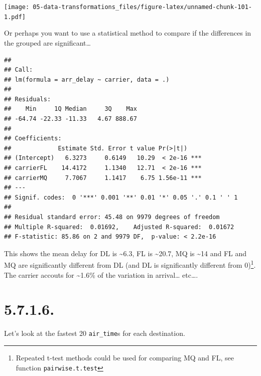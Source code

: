 \documentclass[]{book}
\newenvironment{Shaded}{\begin{snugshade}}{\end{snugshade}}
\newcommand{\DataTypeTok}[1]{\textcolor[rgb]{0.13,0.29,0.53}{#1}}
\newcommand{\KeywordTok}[1]{\textcolor[rgb]{0.13,0.29,0.53}{\textbf{#1}}}
\newcommand{\NormalTok}[1]{#1}
\newcommand{\OperatorTok}[1]{\textcolor[rgb]{0.81,0.36,0.00}{\textbf{#1}}}
\newcommand{\StringTok}[1]{\textcolor[rgb]{0.31,0.60,0.02}{#1}}
\let\rmarkdownfootnote\footnote%
\def\footnote{\protect\rmarkdownfootnote}
\theoremstyle{definition}
\theoremstyle{definition}
\theoremstyle{definition}
\theoremstyle{remark}
\begin{document}
\texttt{[image: 05-data-transformations\_files/figure-latex/unnamed-chunk-101-1.pdf]}

Or perhaps you want to use a statistical method to compare if the
differences in the grouped are significant\ldots{}

\begin{Shaded}
\end{Shaded}

\begin{verbatim}
## 
## Call:
## lm(formula = arr_delay ~ carrier, data = .)
## 
## Residuals:
##    Min     1Q Median     3Q    Max 
## -64.74 -22.33 -11.33   4.67 888.67 
## 
## Coefficients:
##             Estimate Std. Error t value Pr(>|t|)    
## (Intercept)   6.3273     0.6149   10.29  < 2e-16 ***
## carrierFL    14.4172     1.1340   12.71  < 2e-16 ***
## carrierMQ     7.7067     1.1417    6.75 1.56e-11 ***
## ---
## Signif. codes:  0 '***' 0.001 '**' 0.01 '*' 0.05 '.' 0.1 ' ' 1
## 
## Residual standard error: 45.48 on 9979 degrees of freedom
## Multiple R-squared:  0.01692,    Adjusted R-squared:  0.01672 
## F-statistic: 85.86 on 2 and 9979 DF,  p-value: < 2.2e-16
\end{verbatim}

This shows the mean delay for DL is \textasciitilde{}6.3, FL is
\textasciitilde{}20.7, MQ is \textasciitilde{}14 and FL and MQ are
significantly different from DL (and DL is significantly different from
0)\footnote{Repeated t-test methods could be used for comparing MQ and
  FL, see function \texttt{pairwise.t.test}}. The carrier accouts for
\textasciitilde{}1.6\% of the variation in arrival\ldots{} etc\ldots{}.

\hypertarget{section-18}{%
\section{5.7.1.6.}\label{section-18}}

Let's look at the fastest 20 \texttt{air\_time}s for each destination.
\end{document}
